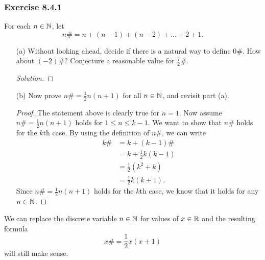 
\subsubsection{Exercise 8.4.1} For each \( n \in \mathbb{N}  \), let 
\[  n \# = n + (n -1 ) + (n-2) + \dots + 2 + 1. \]
\begin{enumerate}
    \item[(a)] Without looking ahead, decide if there is a natural way to define \( 0 \#  \). How about \( (-2) \#  \)? Conjecture a reasonable value for \(  \frac{ 7 }{ 2 }  \# \).
        \begin{proof}[Solution]
        
        \end{proof}
    \item[(b)] Now prove \( n \# = \frac{ 1 }{ 2 }  n (n+1) \) for all \( n \in \mathbb{N}  \), and revisit part (a).
        \begin{proof}
        The statement above is clearly true for \( n =1  \). Now assume \(  n \#   = \frac{ 1 }{ 2 }  n (n+1) \) holds for \(  1 \leq n \leq k -1  \). We want to show that \( n \#  \) holds for the \( k  \)th case. By using the definition of \( n \#  \), we can write 
        \begin{align*}
            k \# &= k + (k-1)\#  \\
                 &= k + \frac{ 1 }{ 2 }  k (k-1) \\
                 &= \frac{ 1 }{ 2 }  (k^{2} + k) \\
                 &= \frac{ 1 }{ 2 } k (k+1).
        \end{align*}
        Since \( n \# = \frac{ 1 }{ 2 }  n (n+1)  \) holds for the \( k  \)th case, we know that it holds for any \( n \in \mathbb{N}  \).
        \end{proof}
\end{enumerate}
We can replace the discrete variable \( n \in \mathbb{N}   \) for values of \( x \in \mathbb{R}  \) and the resulting formula 
\[  x \# = \frac{ 1 }{ 2 }  x (x+1)  \] will still make sense.

